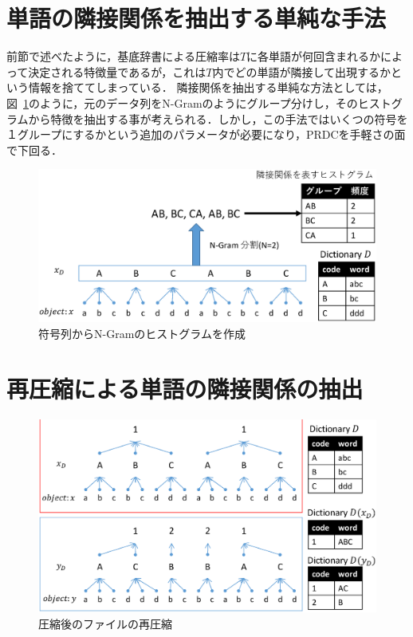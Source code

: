 \section{単語の隣接関係を抽出する単純な手法} %
\label{sec:単語の隣接関係を抽出する単純な手法}
前節で述べたように，基底辞書による圧縮率は$T$に各単語が何回含まれるかによって決定される特徴量であるが，これは$T$内でどの単語が隣接して出現するかという情報を捨ててしまっている．
隣接関係を抽出する単純な方法としては，図~\ref{fig:image/N-Gram.eps}のように，元のデータ列をN-Gramのようにグループ分けし，そのヒストグラムから特徴を抽出する事が考えられる．しかし，この手法ではいくつの符号を１グループにするかという追加のパラメータが必要になり，PRDCを手軽さの面で下回る．

\begin{figure}[tb]
\begin{center}
\includegraphics[clip, width=\columnwidth]{image/N-Gram.eps}
\caption{符号列からN-Gramのヒストグラムを作成}
\label{fig:image/N-Gram.eps}
\end{center}
\end{figure}



\section{再圧縮による単語の隣接関係の抽出}
\begin{figure}[tb]
\begin{center}
\includegraphics[clip, width=\columnwidth]{image/recompress.eps}
\caption{圧縮後のファイルの再圧縮}
\label{fig:image/recompress.eps}
\end{center}
\end{figure}

